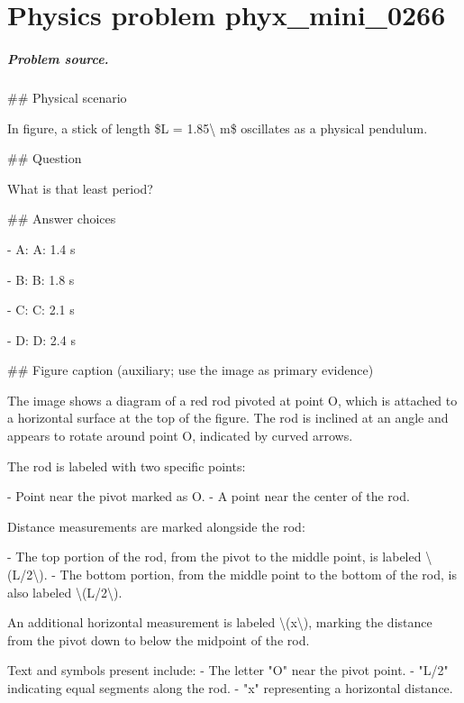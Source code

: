 
\chapter{Physics problem phyx\_mini\_0266}
\label{ch:PhyXMiniProblems_problem_phyx_mini_0266}

\paragraph{Problem source.}
\#\# Physical scenario

In figure, a stick of length \$L = 1.85\textbackslash{} m\$ oscillates as a physical pendulum.

\#\# Question

What is that least period?

\#\# Answer choices

- A: A: 1.4 s

- B: B: 1.8 s

- C: C: 2.1 s

- D: D: 2.4 s

\#\# Figure caption (auxiliary; use the image as primary evidence)

The image shows a diagram of a red rod pivoted at point O, which is attached to a horizontal surface at the top of the figure. The rod is inclined at an angle and appears to rotate around point O, indicated by curved arrows.

The rod is labeled with two specific points:

- Point near the pivot marked as O.
- A point near the center of the rod.

Distance measurements are marked alongside the rod:

- The top portion of the rod, from the pivot to the middle point, is labeled \textbackslash{}(L/2\textbackslash{}).
- The bottom portion, from the middle point to the bottom of the rod, is also labeled \textbackslash{}(L/2\textbackslash{}).

An additional horizontal measurement is labeled \textbackslash{}(x\textbackslash{}), marking the distance from the pivot down to below the midpoint of the rod.

Text and symbols present include:
- The letter "O" near the pivot point.
- "L/2" indicating equal segments along the rod.
- "x" representing a horizontal distance.

